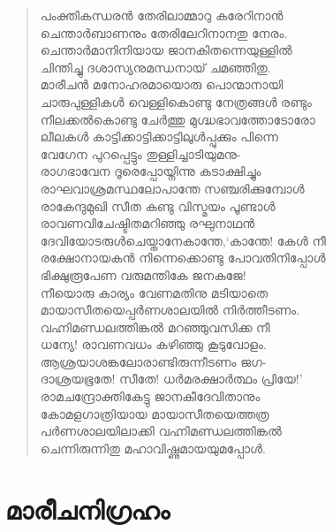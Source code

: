 \begin{verse}
പംക്തികന്ധരന്‍ തേരിലാമ്മാറു കരേറിനാന്‍\\
ചെന്താര്‍ബാണനും തേരിലേറിനാനതു നേരം.\\
ചെന്താര്‍മാനിനിയായ ജാനകിതന്നെയുള്ളില്‍\\
ചിന്തിച്ചു ദശാസ്യനുമന്ധനായ് ചമഞ്ഞിതു.\\
മാരീചന്‍ മനോഹരമായൊരു പൊന്മാനായി\\
ചാരുപുള്ളികള്‍ വെള്ളികൊണ്ടു നേത്രങ്ങള്‍ രണ്ടും\\
നീലക്കല്‍കൊണ്ടു ചേര്‍ത്തു മുഗ്ദ്ധഭാവത്തോടോരോ\\
ലീലകള്‍ കാട്ടിക്കാട്ടിക്കാട്ടിലുള്‍പ്പുക്കും പിന്നെ\\
വേഗേന പുറപ്പെട്ടും തുള്ളിച്ചാടിയുമനു-\\
രാഗഭാവേന ദൂരെപ്പോയ്നിന്നു കടാക്ഷിച്ചും\\
രാഘവാശ്രമസ്ഥലോപാന്തേ സഞ്ചരിക്കുമ്പോള്‍\\
രാകേന്ദുമുഖി സീത കണ്ടു വിസ്മയം പൂണ്ടാള്‍\\
രാവണവിചേഷ്ടിതമറിഞ്ഞു രഘുനാഥന്‍\\
ദേവിയോടരുള്‍ചെയ്താനേകാന്തേ,‘കാന്തേ! കേള്‍ നീ\\
രക്ഷോനായകന്‍ നിന്നെക്കൊണ്ടു പോവതിനിപ്പോള്‍\\
ഭിക്ഷുരൂപേണ വരുമന്തികേ ജനകജേ!\\
നീയൊരു കാര്യം വേണമതിനു മടിയാതെ\\
മായാസീതയെപ്പര്‍ണശാലയില്‍ നിര്‍ത്തീടണം.\\
വഹ്നിമണ്ഡലത്തിങ്കല്‍ മറഞ്ഞുവസിക്ക നീ\\
ധന്യേ! രാവണവധം കഴിഞ്ഞു കൂടുവോളം.\\
ആശ്രയാശങ്കലോരാണ്ടിരുന്നീടണം ജഗ-\\
ദാശ്രയഭൂതേ! സീതേ! ധര്‍മരക്ഷാര്‍ത്ഥം പ്രിയേ!’\\
രാമചന്ദ്രോക്തികേട്ടു ജാനകീദേവിതാനും\\
കോമളഗാത്രിയായ മായാസീതയെത്തത്ര\\
പര്‍ണശാലയിലാക്കി വഹ്നിമണ്ഡലത്തിങ്കല്‍\\
ചെന്നിരുന്നിതു മഹാവിഷ്ണുമായയുമപ്പോള്‍.
\end{verse}

\section{മാരീചനിഗ്രഹം}

